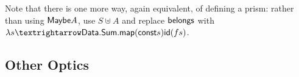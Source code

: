 \documentclass[sigplan,review,anonymous]{acmart}
\begin{document}
{\begin{code}
\AgdaSymbol{(}\AgdaSpace{}%
\AgdaSymbol{)}\AgdaSpace{}%
\AgdaSpace{}%
\AgdaSpace{}%
\AgdaSpace{}%
\AgdaSymbol{(}\AgdaSpace{}%
\AgdaSpace{}%
\AgdaSymbol{)}\AgdaSpace{}%
\AgdaSymbol{|}\AgdaSpace{}%
\AgdaSpace{}%
\AgdaSymbol{(}\AgdaSpace{}%
\AgdaSymbol{)}\AgdaSpace{}%
\AgdaSymbol{(}\AgdaSpace{}%
\AgdaSpace{}%
\AgdaSymbol{)}\<%
\\
%
\>[4]\AgdaSpace{}%
\AgdaSymbol{(}\AgdaSpace{}%
\AgdaSymbol{)}\AgdaSpace{}%
\AgdaSymbol{|}\AgdaSpace{}%
\AgdaSpace{}%
\AgdaSpace{}%
\AgdaSymbol{|}\AgdaSpace{}%
\AgdaOperator{\AgdaInductiveConstructor{[}}\AgdaSpace{}%
\AgdaSpace{}%
\AgdaOperator{\AgdaInductiveConstructor{]}}\AgdaSpace{}%
\AgdaSymbol{=}\AgdaSpace{}%
\AgdaSpace{}%
\AgdaSymbol{(}\AgdaSpace{}%
\AgdaSymbol{(}\AgdaSpace{}%
\AgdaSymbol{)}\AgdaSpace{}%
\AgdaSymbol{(}\AgdaSpace{}%
\AgdaSpace{}%
\AgdaSymbol{))}\<%
\\
%
\>[4]\AgdaSpace{}%
\AgdaSymbol{(}\AgdaSpace{}%
\AgdaSymbol{)}\AgdaSpace{}%
\AgdaSymbol{|}\AgdaSpace{}%
\AgdaSpace{}%
\AgdaSymbol{|}\AgdaSpace{}%
\AgdaOperator{\AgdaInductiveConstructor{[}}\AgdaSpace{}%
\AgdaSpace{}%
\AgdaOperator{\AgdaInductiveConstructor{]}}\AgdaSpace{}%
\AgdaSymbol{=}\AgdaSpace{}%
\AgdaSpace{}%
\AgdaSymbol{(}\AgdaSpace{}%
\AgdaSymbol{(}\AgdaSpace{}%
\AgdaSymbol{(}\AgdaSpace{}%
\AgdaSymbol{)}\AgdaSpace{}%
\AgdaSymbol{(}\AgdaSpace{}%
\AgdaSpace{}%
\AgdaSymbol{)))}\<%
\end{code}
}
Note that there is one more way, again equivalent, of defining a prism:
rather than using $\AgdaRecord{Maybe} A$, use $S ⊎ A$ and replace
$\AgdaField{belongs}$ with
$\lambda s → \AgdaFunction{Data.Sum.map} (\AgdaFunction{const} s) \AgdaFunction{id} (f s)$.

\subsection{Other Optics}
\end{document}
